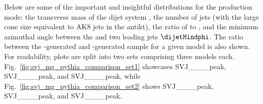 Below are some of the important and insightful distributions for the \schannel production mode: the transverse mass of the dijet system \mT, the number of jets (with the large cone size equivalent to AK8 jets in the \gls{antikt}), the ratio of \MET to \mT, and the minimum azimuthal angle between the \MET and two leading \glspl{jet} $\dijetMindphi$. The ratio between the \MADGRAPH-generated and \PYTHIA-generated sample for a given model is also shown. For readability, plots are split into two sets comprising three models each. Fig.~\ref{fig:svj_mg_pythia_comparison_set1} showcases SVJ\_\_\_\_\-peak, SVJ\_\_\_\_\-peak, and SVJ\_\_\_\_\-peak, while Fig.~\ref{fig:svj_mg_pythia_comparison_set2} shows SVJ\_\_\_\_\-peak, SVJ\_\_\_\_\-peak, and SVJ\_\_\_\_\-peak.

